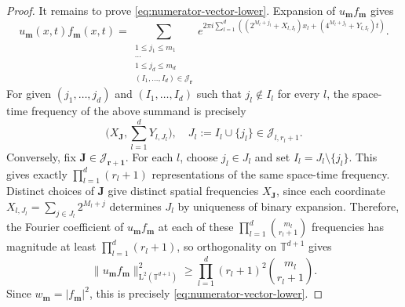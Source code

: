 \documentclass[10pt,a4paper]{amsart}
\numberwithin{equation}{section}
\renewcommand{\leq}{\leqslant}
\renewcommand{\ge}{\geqslant}
\begin{document}
\begin{proof}
It remains to prove \eqref{eq:numerator-vector-lower}. Expansion of $u_{\mathbf{m}}f_{\mathbf{m}}$ gives
\[ u_{\mathbf{m}}(x,t) f_{\mathbf{m}}(x,t)
= \sum_{\substack{1\leq j_1\leq m_1\\ \cdots\\ 1\leq j_d\leq m_d\\ (I_1,\ldots,I_d)\in\mathcal{J}_{\mathbf{r}}}} 
e^{2\pi i\sum_{l=1}^d\left((2^{M_l+j_l}+X_{l,I_l})x_l+(4^{M_l+j_l}+Y_{l,I_l})t\right)}. \]
For given $(j_1,\ldots,j_d)$ and $(I_1,\ldots,I_d)$ such that $j_l\not\in I_l$ for every $l$, the space-time frequency of the above summand is precisely
\[ \biggl(X_{\mathbf{J}},\sum_{l=1}^dY_{l,J_l}\biggr), \quad J_l:=I_l\cup\{j_l\}\in\mathcal{J}_{l,r_l+1}. \]
Conversely, fix $\mathbf{J}\in\mathcal{J}_{\mathbf{r}+\mathbf{1}}$. For each $l$, choose $j_l\in J_l$ and set $I_l=J_l\setminus\{j_l\}$. This gives exactly $\prod_{l=1}^d (r_l+1)$ representations of the same space-time frequency. Distinct choices of $\mathbf{J}$ give distinct spatial frequencies $X_{\mathbf{J}}$, since each coordinate $X_{l,J_l}=\sum_{j\in J_l}2^{M_l+j}$ determines $J_l$ by uniqueness of binary expansion. Therefore, the Fourier coefficient of $u_{\mathbf{m}}f_{\mathbf{m}}$ at each of these $\prod_{l=1}^d \binom{m_l}{r_l+1}$ frequencies has magnitude at least $\prod_{l=1}^d(r_l+1)$, so orthogonality on $\mathbb{T}^{d+1}$ gives
\[ \|u_{\mathbf{m}}f_{\mathbf{m}}\|_{\mathrm{L}^2(\mathbb{T}^{d+1})}^2 \ge \prod_{l=1}^d (r_l+1)^2\binom{m_l}{r_l+1}. \]
Since $w_{\mathbf{m}}=|f_{\mathbf{m}}|^2$, this is precisely \eqref{eq:numerator-vector-lower}.
\end{proof}
\end{document}
